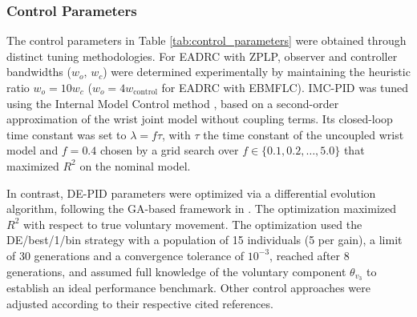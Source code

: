 \subsubsection{Control Parameters}

The control parameters in Table \ref{tab:control_parameters} were obtained through distinct tuning methodologies. For EADRC with ZPLP, observer and controller bandwidths ($w_o,\, w_c$) were determined experimentally by maintaining the heuristic ratio $w_o = 10w_c$ ($w_o=4w_\text{control}$ for EADRC with EBMFLC). IMC-PID was tuned using the Internal Model Control method \citep{Rivera:1986}, based on a second-order approximation of the wrist joint model without coupling terms. Its closed-loop time constant was set to $\lambda = f\tau$, with $\tau$ the time constant of the uncoupled wrist model and $f = 0.4$ chosen by a grid search over $f \in \{0.1, 0.2, \dots, 5.0\}$ that maximized $R^2$ on the nominal model.

In contrast, DE-PID parameters were optimized via a differential evolution algorithm, following the GA-based framework in \cite{Lekshmi:2019}. 
The optimization maximized $R^2$
with respect to true voluntary movement. 
The optimization used the DE/best/1/bin strategy with a population of 15 individuals (5 per gain), a limit of 30 generations and a convergence tolerance of $10^{-3}$, reached after 8 generations, and assumed full knowledge of the voluntary component $\theta_{v_3}$ to establish an ideal performance benchmark. Other control approaches were adjusted according to their respective cited references.

\begin{table}[htbp]
    \centering
    \caption{
        Controllers parameters set considering 
        nominal model response with $\bm\tau$ given by \eqref{eq:tau_v}.
    }
    \label{tab:control_parameters}
    \def\arraystretch{1.3}
    
\end{table}

